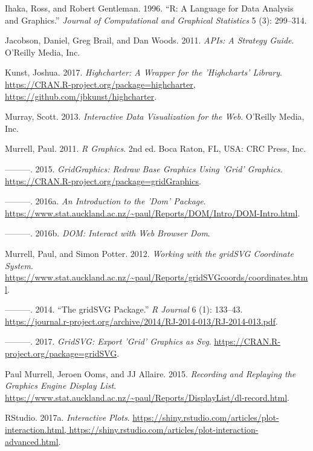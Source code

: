 \documentclass[11pt,]{report}
\begin{document}
\hypertarget{ref-ihaka96}{}
Ihaka, Ross, and Robert Gentleman. 1996. ``R: A Language for Data
Analysis and Graphics.'' \emph{Journal of Computational and Graphical
Statistics} 5 (3): 299--314.

\hypertarget{ref-jacobapi01}{}
Jacobson, Daniel, Greg Brail, and Dan Woods. 2011. \emph{APIs: A
Strategy Guide}. O'Reilly Media, Inc.

\hypertarget{ref-kunst01}{}
Kunst, Joshua. 2017. \emph{Highcharter: A Wrapper for the 'Highcharts'
Library}.
\href{https://CRAN.R-project.org/package=highcharter,\%20https://github.com/jbkunst/highcharter}{https://CRAN.R-project.org/package=highcharter, https://github.com/jbkunst/highcharter}.

\hypertarget{ref-murray13}{}
Murray, Scott. 2013. \emph{Interactive Data Visualization for the Web}.
O'Reilly Media, Inc.

\hypertarget{ref-rgraphics01}{}
Murrell, Paul. 2011. \emph{R Graphics}. 2nd ed. Boca Raton, FL, USA: CRC
Press, Inc.

\hypertarget{ref-gridGra01}{}
---------. 2015. \emph{GridGraphics: Redraw Base Graphics Using 'Grid'
Graphics}. \url{https://CRAN.R-project.org/package=gridGraphics}.

\hypertarget{ref-DOM02}{}
---------. 2016a. \emph{An Introduction to the 'Dom' Package}.
\url{https://www.stat.auckland.ac.nz/~paul/Reports/DOM/Intro/DOM-Intro.html}.

\hypertarget{ref-DOM01}{}
---------. 2016b. \emph{DOM: Interact with Web Browser Dom}.

\hypertarget{ref-gridSVG03}{}
Murrell, Paul, and Simon Potter. 2012. \emph{Working with the gridSVG
Coordinate System}.
\url{https://www.stat.auckland.ac.nz/~paul/Reports/gridSVGcoords/coordinates.html}.

\hypertarget{ref-gridSVG02}{}
---------. 2014. ``The gridSVG Package.'' \emph{R Journal} 6 (1):
133--43.
\url{https://journal.r-project.org/archive/2014/RJ-2014-013/RJ-2014-013.pdf}.

\hypertarget{ref-gridSVG01}{}
---------. 2017. \emph{GridSVG: Export 'Grid' Graphics as Svg}.
\url{https://CRAN.R-project.org/package=gridSVG}.

\hypertarget{ref-record01}{}
Paul Murrell, Jeroen Ooms, and JJ Allaire. 2015. \emph{Recording and
Replaying the Graphics Engine Display List}.
\url{https://www.stat.auckland.ac.nz/~paul/Reports/DisplayList/dl-record.html}.

\hypertarget{ref-shiny03}{}
RStudio. 2017a. \emph{Interactive Plots}.
\href{https://shiny.rstudio.com/articles/plot-interaction.html,\%20https://shiny.rstudio.com/articles/plot-interaction-advanced.html}{https://shiny.rstudio.com/articles/plot-interaction.html, https://shiny.rstudio.com/articles/plot-interaction-advanced.html}.
\end{document}
